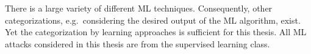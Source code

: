 There is a large variety of different \ac{ML} techniques.
Consequently, other categorizations, e.g.\ considering the desired output of the \ac{ML} algorithm, exist.
Yet the categorization by learning approaches is sufficient for this thesis.
All \ac{ML} attacks considered in this thesis are from the supervised learning class.







